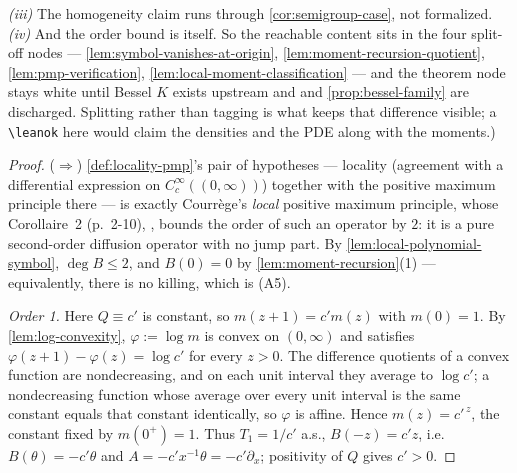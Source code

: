 \begin{theorem}
{\emph{(iii)} The homogeneity claim runs through \ref{cor:semigroup-case}, not formalized.
\emph{(iv)} And the order bound is  itself.
So the reachable content sits in the four split-off nodes ---
\ref{lem:symbol-vanishes-at-origin}, \ref{lem:moment-recursion-quotient},
\ref{lem:pmp-verification}, \ref{lem:local-moment-classification} --- and the theorem node stays
white until Bessel $K$ exists upstream and  and \ref{prop:bessel-family} are
discharged. Splitting rather than tagging is what keeps that difference visible; a
\texttt{\textbackslash leanok} here would claim the densities and the PDE along with the
moments.)}
\end{theorem}

\begin{proof}
($\Rightarrow$) \ref{def:locality-pmp}'s pair of hypotheses --- locality (agreement with a
differential expression on $C_c^\infty((0,\infty))$) together with the positive maximum
principle there --- is exactly Courrège's \emph{local} positive maximum principle, whose
Corollaire~2 (p.~2-10), , bounds the order of such an operator by $2$: it is a pure
second-order diffusion operator with no jump part. By \ref{lem:local-polynomial-symbol},
$\deg B \le 2$, and $B(0) = 0$ by \ref{lem:moment-recursion}(1) --- equivalently, there is no
killing, which is (A5).

\emph{Order 1.} Here $Q \equiv c'$ is constant, so $m(z+1) = c'm(z)$ with $m(0)=1$. By
\ref{lem:log-convexity}, $\varphi := \log m$ is convex on $(0,\infty)$ and satisfies
$\varphi(z+1) - \varphi(z) = \log c'$ for every $z > 0$. The difference quotients of a convex
function are nondecreasing, and on each unit interval they average to $\log c'$; a nondecreasing
function whose average over every unit interval is the same constant equals that constant
identically, so $\varphi$ is affine. Hence $m(z) = c'^{\,z}$, the constant fixed by
$m(0^+) = 1$. Thus $T_1 = 1/c'$ a.s., $B(-z) = c'z$, i.e.\ $B(\theta) = -c'\theta$ and
$A = -c'x^{-1}\theta = -c'\partial_x$; positivity of $Q$ gives $c' > 0$.


\end{proof}
